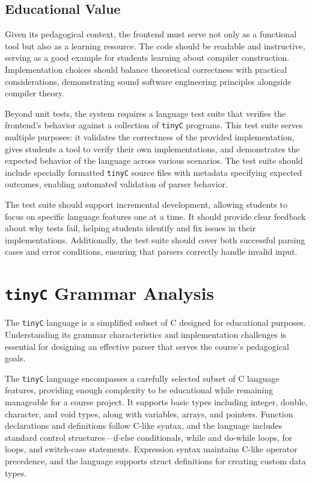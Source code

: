 \subsection{Educational Value}
Given its pedagogical context, the frontend must serve not only as a functional tool but also as a learning resource. The code should be readable and instructive, serving as a good example for students learning about compiler construction. Implementation choices should balance theoretical correctness with practical considerations, demonstrating sound software engineering principles alongside compiler theory.

Beyond unit tests, the system requires a language test suite that verifies the frontend's behavior against a collection of \texttt{tinyC} programs. This test suite serves multiple purposes: it validates the correctness of the provided implementation, gives students a tool to verify their own implementations, and demonstrates the expected behavior of the language across various scenarios. The test suite should include specially formatted \texttt{tinyC} source files with metadata specifying expected outcomes, enabling automated validation of parser behavior.

The test suite should support incremental development, allowing students to focus on specific language features one at a time. It should provide clear feedback about why tests fail, helping students identify and fix issues in their implementations. Additionally, the test suite should cover both successful parsing cases and error conditions, ensuring that parsers correctly handle invalid input.

\section{\texttt{tinyC} Grammar Analysis}

The \texttt{tinyC} language is a simplified subset of C designed for educational purposes. Understanding its grammar characteristics and implementation challenges is essential for designing an effective parser that serves the course's pedagogical goals.

The \texttt{tinyC} language encompasses a carefully selected subset of C language features, providing enough complexity to be educational while remaining manageable for a course project. It supports basic types including integer, double, character, and void types, along with variables, arrays, and pointers. Function declarations and definitions follow C-like syntax, and the language includes standard control structures—if-else conditionals, while and do-while loops, for loops, and switch-case statements. Expression syntax maintains C-like operator precedence, and the language supports struct definitions for creating custom data types.

